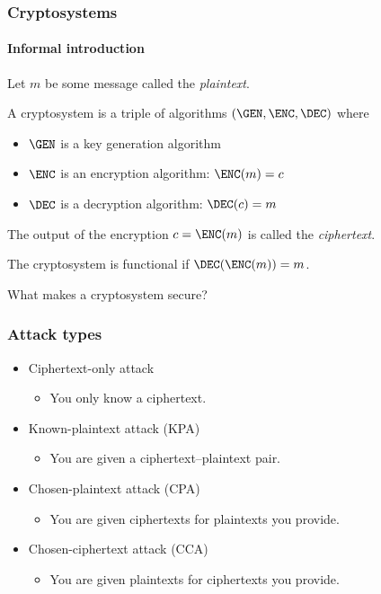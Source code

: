 \begin{frame}
  \frametitle{Cryptosystems}
  \framesubtitle{Informal introduction}

  \pause
  Let $m$ be some message called the \emph{plaintext}.

  \vspace*{1em}

  \pause
  A cryptosystem is a triple of algorithms $(\GEN,\ENC,\DEC)$ where
  \begin{itemize}
    \item $\GEN$ is a key generation algorithm
    \item $\ENC$ is an encryption algorithm: $\ENC(m)=c$
    \item $\DEC$ is a decryption algorithm: $\DEC(c)=m$
  \end{itemize}

  \vspace*{1em}

  \pause
  The output of the encryption $c = \ENC(m)$ is called the \emph{ciphertext}.

  \vspace*{1em}

  \pause
  The cryptosystem is functional if $\DEC(\ENC(m))=m$.
\end{frame}

\begin{frame}[c]
  \centering
  What makes a cryptosystem secure?
\end{frame}

\begin{frame}
  \frametitle{Attack types}

  \pause
  \begin{itemize}
    \item Ciphertext-only attack
    \begin{itemize}
      \item You only know a ciphertext.
    \end{itemize}
    \pause
    \item Known-plaintext attack (KPA)
    \begin{itemize}
      \item You are given a ciphertext--plaintext pair.
    \end{itemize}
    \pause
    \item Chosen-plaintext attack (CPA)
    \begin{itemize}
      \item You are given ciphertexts for plaintexts you provide.
    \end{itemize}
    \pause
    \item Chosen-ciphertext attack (CCA)
    \begin{itemize}
      \item You are given plaintexts for ciphertexts you provide.
    \end{itemize}
  \end{itemize}
\end{frame}

